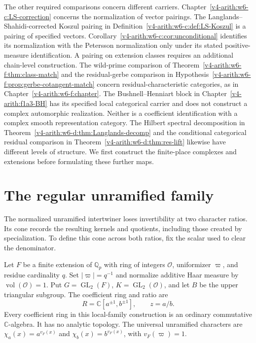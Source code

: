 The other required comparisons concern different carriers.
Chapter~\ref{v4-arith:w6-c:LS-correction} concerns the normalization
of vector pairings. The
Langlands--Shahidi-corrected Koszul pairing in
Definition~\ref{v4-arith:w6-c:def:LS-Koszul} is a pairing of specified
vectors. Corollary~\ref{v4-arith:w6-c:cor:unconditional} identifies its
normalization with the Petersson normalization only under its stated
positive-measure identification. A pairing on extension classes
requires an additional chain-level construction. The wild-prime
comparison of Theorem~\ref{v4-arith:w6-f:thm:class-match} and the
residual-gerbe comparison in
Hypothesis~\ref{v4-arith:w6-f:prop:gerbe-cotangent-match} concern
residual-characteristic categories, as in
Chapter~\ref{v4-arith:w6-f:chapter}. The Bushnell--Henniart block in
Chapter~\ref{v4-arith:f1a3-BH} has its specified local categorical
carrier and does not construct a complex automorphic realization. Neither is a coefficient
identification with a complex smooth representation category.
The Hilbert spectral decomposition in
Theorem~\ref{v4-arith:w6-d:thm:Langlands-decomp} and the conditional
categorical residual comparison in
Theorem~\ref{v4-arith:w6-d:thm:res-lift} likewise have different
levels of structure. We first construct the finite-place complexes
and extensions before formulating these further maps.

\section{The regular unramified family}

The normalized unramified intertwiner loses invertibility at two character ratios.
Its cone records the resulting kernels and quotients, including those created by specialization.
To define this cone across both ratios, fix the scalar used to clear the denominator.

Let $F$ be a finite extension of $\mathbb Q_p$ with ring of integers $\mathcal O$,
uniformizer $\varpi$, and residue cardinality $q$.
Set $|\varpi|=q^{-1}$ and normalize additive Haar measure by
$\operatorname{vol}(\mathcal O)=1$.
Put $G=\operatorname{GL}_2(F)$, $K=\operatorname{GL}_2(\mathcal O)$,
and let $B$ be the upper triangular subgroup.
The coefficient ring and ratio are
\[
 R=\mathbb C[a^{\pm1},b^{\pm1}],\qquad z=a/b.
\]
Every coefficient ring in this local-family construction is an ordinary commutative $\mathbb C$-algebra.
It has no analytic topology.
The universal unramified characters are
$\chi_a(x)=a^{v_F(x)}$ and $\chi_b(x)=b^{v_F(x)}$, with $v_F(\varpi)=1$.

